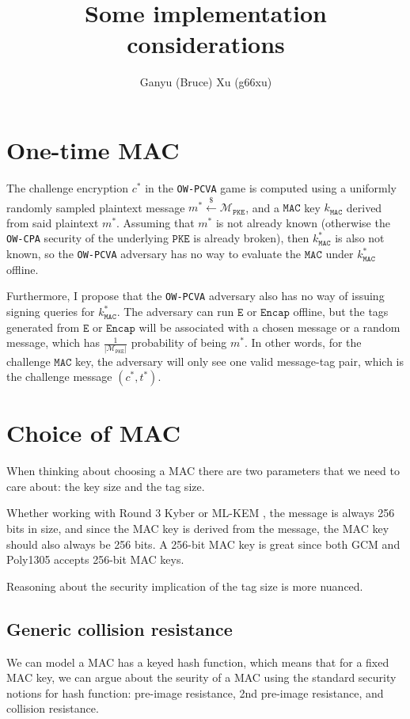 \documentclass{article}
\title{Some implementation considerations}
\author{Ganyu (Bruce) Xu (g66xu)}
\newcommand{\monospace}{\texttt}
\newcommand{\pke}{\monospace{PKE}}
\newcommand{\encrypt}{\monospace{E}}
\newcommand{\encap}{\monospace{Encap}}
\newcommand{\mac}{\monospace{MAC}}
\newcommand{\leftsample}{\stackrel{\$}{\leftarrow}}
\newcommand{\norm}[1]{\left\lvert #1 \right\rvert}
\begin{document}
\maketitle

\section{One-time MAC}
The challenge encryption $c^\ast$ in the \monospace{OW-PCVA} game is computed using a uniformly randomly sampled plaintext message $m^\ast \leftsample \mathcal{M}_\pke$, and a $\mac$ key $k_\mac$ derived from said plaintext $m^\ast$. Assuming that $m^\ast$ is not already known (otherwise the \monospace{OW-CPA} security of the underlying $\pke$ is already broken), then $k^\ast_\mac$ is also not known, so the \monospace{OW-PCVA} adversary has no way to evaluate the $\mac$ under $k^\ast_\mac$ offline.

Furthermore, I propose that the \monospace{OW-PCVA} adversary also has no way of issuing signing queries for $k^\ast_\mac$. The adversary can run $\encrypt$ or $\encap$ offline, but the tags generated from $\encrypt$ or $\encap$ will be associated with a chosen message or a random message, which has $\frac{1}{\norm{\mathcal{M}_\pke}}$ probability of being $m^\ast$. In other words, for the challenge $\mac$ key, the adversary will only see one valid message-tag pair, which is the challenge message $(c^\ast, t^\ast)$.



\section{Choice of MAC}
When thinking about choosing a MAC there are two parameters that we need to care about: the key size and the tag size.

Whether working with Round 3 Kyber \cite{avanzi2019crystals} or ML-KEM \cite{key2023mechanism}, the message is always 256 bits in size, and since the MAC key is derived from the message, the MAC key should also always be 256 bits. A 256-bit MAC key is great since both GCM and Poly1305 accepts 256-bit MAC keys.

Reasoning about the security implication of the tag size is more nuanced.

\subsection{Generic collision resistance}
We can model a MAC has a keyed hash function, which means that for a fixed MAC key, we can argue about the seurity of a MAC using the standard security notions for hash function: pre-image resistance, 2nd pre-image resistance, and collision resistance.
\end{document}
